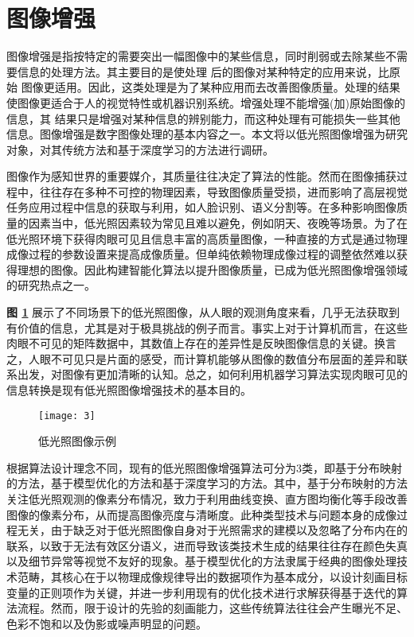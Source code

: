 \section{图像增强} 
\label{sec:image_enhancement}

图像增强是指按特定的需要突出一幅图像中的某些信息，同时削弱或去除某些不需 要信息的处理方法。其主要目的是使处理 后的图像对某种特定的应用来说，比原始 图像更适用。因此，这类处理是为了某种应用而去改善图像质量。处理的结果使图像更适合于人的视觉特性或机器识别系统。增强处理不能增强(加)原始图像的信息，其 结果只是增强对某种信息的辨别能力，而这种处理有可能损失一些其他信息。图像增强是数字图像处理的基本内容之一。本文将以低光照图像增强为研究对象，对其传统方法和基于深度学习的方法进行调研。

图像作为感知世界的重要媒介，其质量往往决定了算法的性能。然而在图像捕获过程中，往往存在多种不可控的物理因素，导致图像质量受损，进而影响了高层视觉任务应用过程中信息的获取与利用，如人脸识别、语义分割等。在多种影响图像质量的因素当中，低光照因素较为常见且难以避免，例如阴天、夜晚等场景。为了在低光照环境下获得肉眼可见且信息丰富的高质量图像，一种直接的方式是通过物理成像过程的参数设置来提高成像质量。但单纯依赖物理成像过程的调整依然难以获得理想的图像。因此构建智能化算法以提升图像质量，已成为低光照图像增强领域的研究热点之一。

\textbf{图 \ref{fig:fig3}} 展示了不同场景下的低光照图像，从人眼的观测角度来看，几乎无法获取到有价值的信息，尤其是对于极具挑战的例子而言。事实上对于计算机而言，在这些肉眼不可见的矩阵数据中，其数值上存在的差异性是反映图像信息的关键。换言之，人眼不可见只是片面的感受，而计算机能够从图像的数值分布层面的差异和联系出发，对图像有更加清晰的认知。总之，如何利用机器学习算法实现肉眼可见的信息转换是现有低光照图像增强技术的基本目的。

\begin{figure}[!ht]
	\centering
	\texttt{[image: 3]}
	\caption{低光照图像示例}
	\label{fig:fig3}
\end{figure}

根据算法设计理念不同，现有的低光照图像增强算法可分为3类，即基于分布映射的方法，基于模型优化的方法和基于深度学习的方法。其中，基于分布映射的方法关注低光照观测的像素分布情况，致力于利用曲线变换、直方图均衡化等手段改善图像的像素分布，从而提高图像亮度与清晰度。此种类型技术与问题本身的成像过程无关，由于缺乏对于低光照图像自身对于光照需求的建模以及忽略了分布内在的联系，以致于无法有效区分语义，进而导致该类技术生成的结果往往存在颜色失真以及细节异常等视觉不友好的现象。基于模型优化的方法隶属于经典的图像处理技术范畴，其核心在于以物理成像规律导出的数据项作为基本成分，以设计刻画目标变量的正则项作为关键，并进一步利用现有的优化技术进行求解获得基于迭代的算法流程。然而，限于设计的先验的刻画能力，这些传统算法往往会产生曝光不足、色彩不饱和以及伪影或噪声明显的问题。

